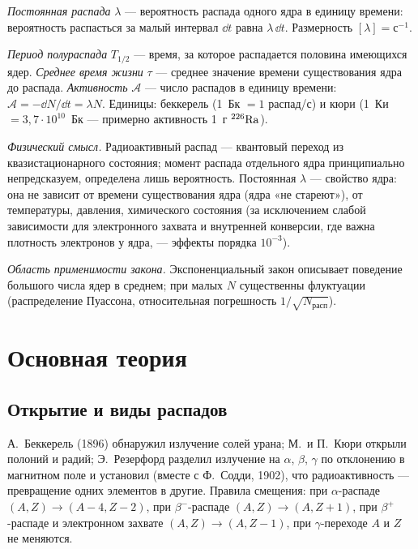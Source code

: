 \begin{definition}
\emph{Постоянная распада} $\lambda$ — вероятность распада одного ядра в единицу времени: вероятность распасться за малый
интервал $\dd t$ равна $\lambda\,\dd t$. Размерность $[\lambda]=\text{с}^{-1}$.
\end{definition}

\begin{definition}
\emph{Период полураспада} $T_{1/2}$ — время, за которое распадается половина имеющихся ядер. \emph{Среднее время жизни}
$\tau$ — среднее значение времени существования ядра до распада. \emph{Активность} $\mathcal A$ — число распадов в единицу
времени: $\mathcal A=-\dd N/\dd t=\lambda N$. Единицы: беккерель (1~Бк $=1$ распад/с) и кюри (1~Ки $=3{,}7\cdot10^{10}$~Бк —
примерно активность 1~г $\nucl{Ra}{226}$).
\end{definition}

\emph{Физический смысл.} Радиоактивный распад — квантовый переход из квазистационарного состояния; момент распада
отдельного ядра принципиально непредсказуем, определена лишь вероятность. Постоянная $\lambda$ — свойство ядра:
она не зависит от времени существования ядра (ядра «не стареют»), от температуры, давления, химического состояния
(за исключением слабой зависимости для электронного захвата и внутренней конверсии, где важна плотность электронов
у ядра, — эффекты порядка $10^{-3}$).

\emph{Область применимости закона.} Экспоненциальный закон описывает поведение большого числа ядер в среднем; при
малых $N$ существенны флуктуации (распределение Пуассона, относительная погрешность $1/\sqrt{N_{\text{расп}}}$).

\section{Основная теория}

\subsection{Открытие и виды распадов}

А.~Беккерель (1896) обнаружил излучение солей урана; М.~и П.~Кюри открыли полоний и радий; Э.~Резерфорд разделил
излучение на $\alpha$, $\beta$, $\gamma$ по отклонению в магнитном поле и установил (вместе с Ф.~Содди, 1902), что радиоактивность —
превращение одних элементов в другие. Правила смещения: при $\alpha$-распаде $(A,Z)\to(A-4,Z-2)$, при $\beta^-$-распаде
$(A,Z)\to(A,Z+1)$, при $\beta^+$-распаде и электронном захвате $(A,Z)\to(A,Z-1)$, при $\gamma$-переходе $A$ и $Z$ не меняются.

